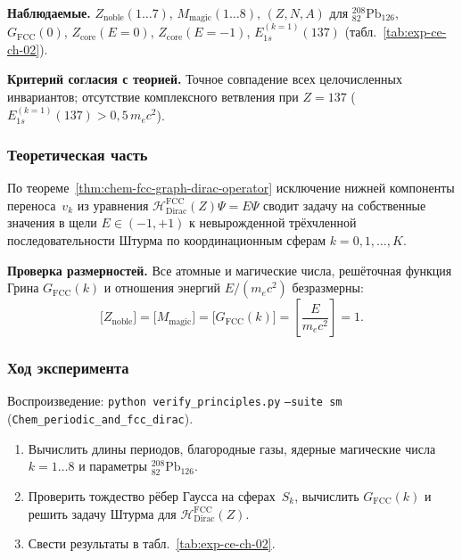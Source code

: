\textbf{Наблюдаемые.}
$Z_{\mathrm{noble}}(1\ldots 7)$, $M_{\mathrm{magic}}(1\ldots 8)$, $(Z,N,A)$ для $^{208}_{82}\text{Pb}_{126}$, $G_{\mathrm{FCC}}(0)$, $Z_{\mathrm{core}}(E=0)$, $Z_{\mathrm{core}}(E=-1)$, $E_{1s}^{(k=1)}(137)$ (табл.~\ref{tab:exp-ce-ch-02}).

\textbf{Критерий согласия с теорией.}
Точное совпадение всех целочисленных инвариантов; отсутствие комплексного ветвления при $Z=137$ ($E_{1s}^{(k=1)}(137) > 0{,}5\,m_e c^2$).

\subsubsection*{Теоретическая часть}
По теореме~\ref{thm:chem-fcc-graph-dirac-operator} исключение нижней компоненты переноса~$v_k$ из уравнения $\mathcal{H}_{\mathrm{Dirac}}^{\mathrm{FCC}}(Z)\Psi = E\Psi$ сводит задачу на собственные значения в щели $E \in (-1,+1)$ к невырожденной трёхчленной последовательности Штурма по координационным сферам $k=0,1,\ldots,K$.

\textbf{Проверка размерностей.}
Все атомные и магические числа, решёточная функция Грина $G_{\mathrm{FCC}}(k)$ и отношения энергий $E/(m_e c^2)$ безразмерны:
\[
  \bigl[Z_{\mathrm{noble}}\bigr] = \bigl[M_{\mathrm{magic}}\bigr] = \bigl[G_{\mathrm{FCC}}(k)\bigr] = \left[\frac{E}{m_e c^2}\right] = 1.
\]

\subsubsection*{Ход эксперимента}
{\sloppy Воспроизведение: \texttt{python verify\_principles.py} \texttt{--suite sm} (\texttt{Chem\_periodic\_and\_fcc\_dirac}).\par}

\begin{enumerate}[label=\textbf{Шаг \arabic*:},leftmargin=*,itemsep=0.35em]
\item Вычислить длины периодов, благородные газы, ядерные магические числа $k=1\ldots 8$ и параметры $^{208}_{82}\text{Pb}_{126}$.
\item Проверить тождество рёбер Гаусса на сферах~$S_k$, вычислить $G_{\mathrm{FCC}}(k)$ и решить задачу Штурма для $\mathcal{H}_{\mathrm{Dirac}}^{\mathrm{FCC}}(Z)$.
\item Свести результаты в табл.~\ref{tab:exp-ce-ch-02}.
\end{enumerate}

